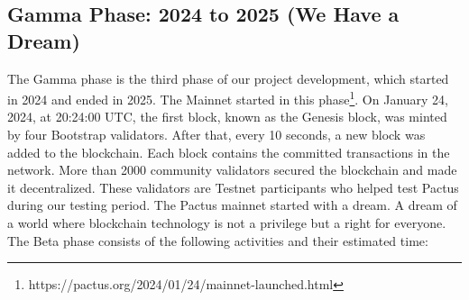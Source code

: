 \documentclass{novel}
\begin{document}
\subsection{Gamma Phase: 2024 to 2025 (We Have a Dream)}
The Gamma phase is the third phase of our project development, which started in 2024 and ended in 2025. The Mainnet started in this phase\footnote{https://pactus.org/2024/01/24/mainnet-launched.html}. On January 24, 2024, at 20:24:00 UTC, the first block, known as the Genesis block, was minted by four Bootstrap validators. After that, every 10 seconds, a new block was added to the blockchain. Each block contains the committed transactions in the network. More than 2000 community validators secured the blockchain and made it decentralized. These validators are Testnet participants who helped test Pactus during our testing period. The Pactus mainnet started with a dream. A dream of a world where blockchain technology is not a privilege but a right for everyone. The Beta phase consists of the following activities and their estimated time:
\end{document}
